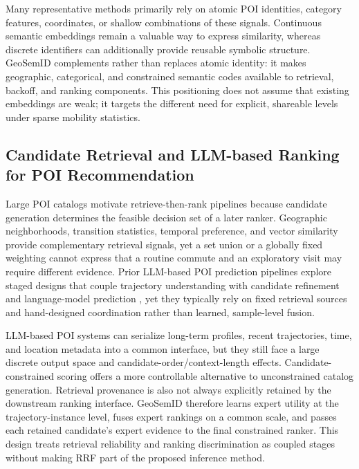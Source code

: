 \documentclass[journal]{IEEEtran}
\begin{document}
Many representative methods primarily rely on atomic POI identities, category
features, coordinates, or shallow combinations of these signals. Continuous
semantic embeddings remain a valuable way to express similarity, whereas
discrete identifiers can additionally provide reusable symbolic structure.
GeoSemID complements rather than replaces atomic
identity: it makes geographic, categorical, and constrained semantic codes
available to retrieval, backoff, and ranking components. This positioning does
not assume that existing embeddings are weak; it targets the different need
for explicit, shareable levels under sparse mobility statistics.

\subsection{Candidate Retrieval and LLM-based Ranking for POI Recommendation}
\label{subsec:rw_retrieval_ranking}

Large POI catalogs motivate retrieve-then-rank pipelines because candidate
generation determines the feasible decision set of a later ranker. Geographic
neighborhoods, transition statistics, temporal preference, and vector
similarity provide complementary retrieval signals, yet a set union or a
globally fixed weighting cannot express that a routine commute and an
exploratory visit may require different evidence. Prior LLM-based POI prediction
pipelines explore staged designs that couple trajectory understanding with
candidate refinement and language-model prediction
\cite{zhong2025,li2024llm4poi,feng2024llmmove}, yet they
typically rely on fixed retrieval sources and hand-designed coordination rather
than learned, sample-level fusion.

LLM-based POI systems can serialize long-term profiles, recent trajectories,
time, and location metadata into a common interface, but they still face a
large discrete output space and candidate-order/context-length effects.
Candidate-constrained scoring offers a more controllable alternative to
unconstrained catalog generation. Retrieval provenance is also not always explicitly retained by
the downstream ranking interface. GeoSemID therefore learns expert utility at
the trajectory-instance level, fuses expert rankings on a common scale, and
passes each retained candidate's expert evidence to the final constrained
ranker. This design treats retrieval reliability and ranking discrimination as
coupled stages without making RRF part of the proposed inference method.
\end{document}
